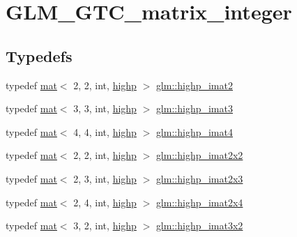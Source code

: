 \hypertarget{group__gtc__matrix__integer}{}\section{G\+L\+M\+\_\+\+G\+T\+C\+\_\+matrix\+\_\+integer}
\label{group__gtc__matrix__integer}
\subsection*{Typedefs}
\begin{DoxyCompactItemize}
\item 
typedef \hyperlink{structglm_1_1mat}{mat}$<$ 2, 2, int, \hyperlink{namespaceglm_a36ed105b07c7746804d7fdc7cc90ff25ac6f7eab42eacbb10d59a58e95e362074}{highp} $>$ \hyperlink{group__gtc__matrix__integer_ga5b3d41917c60488d2babd72ca26d01ba}{glm\+::highp\+\_\+imat2}
\item 
typedef \hyperlink{structglm_1_1mat}{mat}$<$ 3, 3, int, \hyperlink{namespaceglm_a36ed105b07c7746804d7fdc7cc90ff25ac6f7eab42eacbb10d59a58e95e362074}{highp} $>$ \hyperlink{group__gtc__matrix__integer_ga3a8088cb8c764ec1c3719f31b3687ba8}{glm\+::highp\+\_\+imat3}
\item 
typedef \hyperlink{structglm_1_1mat}{mat}$<$ 4, 4, int, \hyperlink{namespaceglm_a36ed105b07c7746804d7fdc7cc90ff25ac6f7eab42eacbb10d59a58e95e362074}{highp} $>$ \hyperlink{group__gtc__matrix__integer_ga2f3fec7874f434d081a186d11ccbed3c}{glm\+::highp\+\_\+imat4}
\item 
typedef \hyperlink{structglm_1_1mat}{mat}$<$ 2, 2, int, \hyperlink{namespaceglm_a36ed105b07c7746804d7fdc7cc90ff25ac6f7eab42eacbb10d59a58e95e362074}{highp} $>$ \hyperlink{group__gtc__matrix__integer_ga9d5c6c5a4640f7c794a77e3f60b91670}{glm\+::highp\+\_\+imat2x2}
\item 
typedef \hyperlink{structglm_1_1mat}{mat}$<$ 2, 3, int, \hyperlink{namespaceglm_a36ed105b07c7746804d7fdc7cc90ff25ac6f7eab42eacbb10d59a58e95e362074}{highp} $>$ \hyperlink{group__gtc__matrix__integer_ga6bf015d7d01115e1d71362f2aa1cd3c4}{glm\+::highp\+\_\+imat2x3}
\item 
typedef \hyperlink{structglm_1_1mat}{mat}$<$ 2, 4, int, \hyperlink{namespaceglm_a36ed105b07c7746804d7fdc7cc90ff25ac6f7eab42eacbb10d59a58e95e362074}{highp} $>$ \hyperlink{group__gtc__matrix__integer_ga5e3a9d05895fbefef19c051e60ca81c4}{glm\+::highp\+\_\+imat2x4}
\item 
typedef \hyperlink{structglm_1_1mat}{mat}$<$ 3, 2, int, \hyperlink{namespaceglm_a36ed105b07c7746804d7fdc7cc90ff25ac6f7eab42eacbb10d59a58e95e362074}{highp} $>$ \hyperlink{group__gtc__matrix__integer_gaf5097ad25b9a991ad010aba6736b333e}{glm\+::highp\+\_\+imat3x2}

\end{DoxyCompactItemize}
